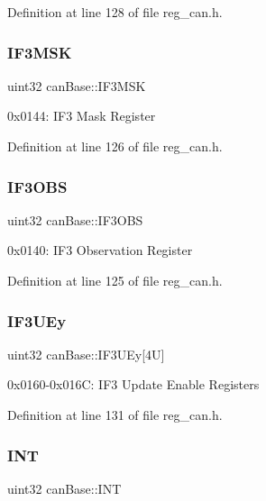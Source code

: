 Definition at line 128 of file reg\+\_\+can.\+h.

\mbox{\label{structcanBase_a2e1ed9b95a49858df359a8e885e155ec}} 
\subsubsection{\texorpdfstring{I\+F3\+M\+SK}{IF3MSK}}
{\footnotesize\ttfamily uint32 can\+Base\+::\+I\+F3\+M\+SK}

0x0144\+: I\+F3 Mask Register 

Definition at line 126 of file reg\+\_\+can.\+h.

\mbox{\label{structcanBase_aa3df54152de0b4f6277e4f2429eb767c}} 
\subsubsection{\texorpdfstring{I\+F3\+O\+BS}{IF3OBS}}
{\footnotesize\ttfamily uint32 can\+Base\+::\+I\+F3\+O\+BS}

0x0140\+: I\+F3 Observation Register 

Definition at line 125 of file reg\+\_\+can.\+h.

\mbox{\label{structcanBase_a2e5dfaefafebbc2918815564d1f37d5a}} 
\subsubsection{\texorpdfstring{I\+F3\+U\+Ey}{IF3UEy}}
{\footnotesize\ttfamily uint32 can\+Base\+::\+I\+F3\+U\+Ey\mbox{[}4\+U\mbox{]}}

0x0160-\/0x016C\+: I\+F3 Update Enable Registers 

Definition at line 131 of file reg\+\_\+can.\+h.

\mbox{\label{structcanBase_ae12daf80850a231439fc9f6ce947db4b}} 
\subsubsection{\texorpdfstring{I\+NT}{INT}}
{\footnotesize\ttfamily uint32 can\+Base\+::\+I\+NT}

